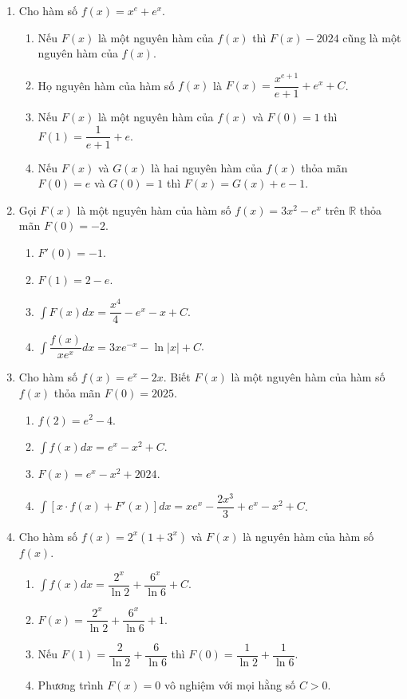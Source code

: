 \documentclass[12pt]{article}
\begin{document}
\begin{enumerate}[label=\textbf{Câu \arabic*.}, start=1]
		\item Cho hàm số $f(x) = x^e + e^x$.
		\begin{enumerate}[label=\alph*)]
			\item Nếu $F(x)$ là một nguyên hàm của $f(x)$ thì $F(x) - 2024$ cũng là một nguyên hàm của $f(x)$.
			\item Họ nguyên hàm của hàm số $f(x)$ là $F(x) = \dfrac{x^{e+1}}{e+1} + e^x + C$.
			\item Nếu $F(x)$ là một nguyên hàm của $f(x)$ và $F(0) = 1$ thì $F(1) = \dfrac{1}{e+1} + e$.
			\item Nếu $F(x)$ và $G(x)$ là hai nguyên hàm của $f(x)$ thỏa mãn $F(0) = e$ và $G(0) = 1$ thì $F(x) = G(x) + e - 1$.
		\end{enumerate}
		
		\item Gọi $F(x)$ là một nguyên hàm của hàm số $f(x) = 3x^2 - e^x$ trên $\mathbb{R}$ thỏa mãn $F(0) = -2$.
		\begin{enumerate}[label=\alph*)]
			\item $F'(0) = -1$.
			\item $F(1) = 2 - e$.
			\item $\displaystyle \int F(x) dx = \dfrac{x^4}{4} - e^x - x + C$.
			\item $\displaystyle \int \dfrac{f(x)}{x e^x} dx = 3x e^{-x} - \ln|x| + C$.
		\end{enumerate}
		
		\item Cho hàm số $f(x) = e^x - 2x$. Biết $F(x)$ là một nguyên hàm của hàm số $f(x)$ thỏa mãn $F(0) = 2025$.
		\begin{enumerate}[label=\alph*)]
			\item $f(2) = e^2 - 4$.
			\item $\displaystyle \int f(x) dx = e^x - x^2 + C$.
			\item $F(x) = e^x - x^2 + 2024$.
			\item $\displaystyle \int \left[ x \cdot f(x) + F'(x) \right] dx = x e^x - \dfrac{2x^3}{3} + e^x - x^2 + C$.
		\end{enumerate}
		
		\item Cho hàm số $f(x) = 2^x(1 + 3^x)$ và $F(x)$ là nguyên hàm của hàm số $f(x)$.
		\begin{enumerate}[label=\alph*)]
			\item $\displaystyle \int f(x) dx = \dfrac{2^x}{\ln 2} + \dfrac{6^x}{\ln 6} + C$.
			\item $F(x) = \dfrac{2^x}{\ln 2} + \dfrac{6^x}{\ln 6} + 1$.
			\item Nếu $F(1) = \dfrac{2}{\ln 2} + \dfrac{6}{\ln 6}$ thì $F(0) = \dfrac{1}{\ln 2} + \dfrac{1}{\ln 6}$.
			\item Phương trình $F(x) = 0$ vô nghiệm với mọi hằng số $C > 0$.
		\end{enumerate}
		

\end{enumerate}
\end{document}
